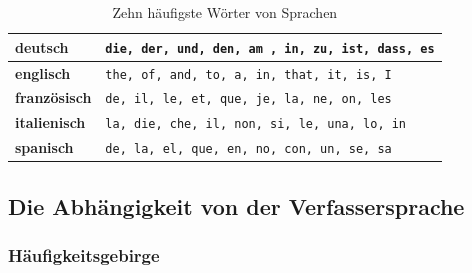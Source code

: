 \documentclass[%
11pt,%
twoside,%
titlepage,%
german,%
headsepline%
]{scrartcl}
\newcommand{\spaltenheight}{\rule{0mm}{3ex}}
\newcommand{\spaltensep}{\\[1ex]}
\begin{document}
\begin{table}
\begin{center}
\begin{tabular}{|l|l|}
\hline
\rowcolor{lightyellow}\spaltenheight \textbf{deutsch} &	\texttt{die, der, und, den, am , in, zu, ist, dass, es}\spaltensep\hline
\rowcolor{Gray}\spaltenheight \textbf{englisch} &	\texttt{the, of, and, to, a, in, that, it, is, I}\spaltensep\hline
\rowcolor{lightyellow}\spaltenheight \textbf{französisch} &	\texttt{de, il, le, et, que, je, la, ne, on, les}\spaltensep\hline
\rowcolor{Gray}\spaltenheight \textbf{italienisch} &	\texttt{la, die, che, il, non, si, le, una, lo, in}\spaltensep\hline
\rowcolor{lightyellow}\spaltenheight \textbf{spanisch} &	 \texttt{de, la, el, que, en, no, con, un, se, sa}\spaltensep\hline
\end{tabular}
\end{center}
\caption{Zehn häufigste Wörter von Sprachen}\label{zehn}
\end{table}

\subsection{Die Abhängigkeit von der Verfassersprache}

\subsubsection{Häufigkeitsgebirge}
\end{document}

